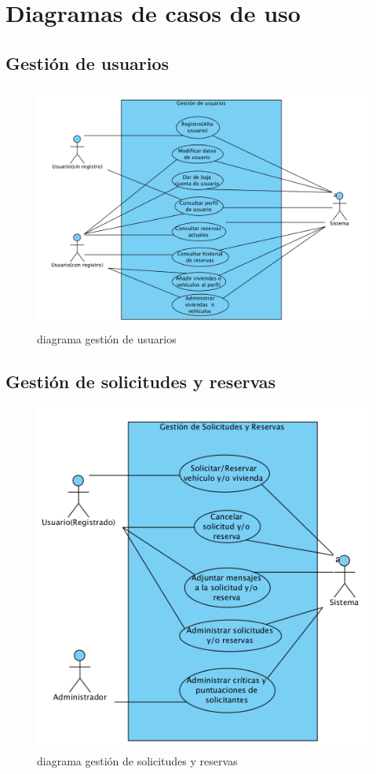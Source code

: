 \section{Diagramas de casos de uso}
	\subsection{Gestión de usuarios}
		\begin{figure}[h!]
			\centering
			\includegraphics[width=1.15\linewidth]{Gestion_usuarios}
			\caption{diagrama gestión de usuarios}
			\label{fig:gestionusuarios}
		\end{figure}
\newpage
	\subsection{Gestión de solicitudes y reservas}
		\begin{figure}[h!]
			\centering
			\includegraphics[width=1\linewidth]{Gestion_solicitudes_reservas}
			\caption{diagrama gestión de solicitudes y reservas}
			\label{fig:gestionsolicitudesreservas}
		\end{figure}
\newpage
